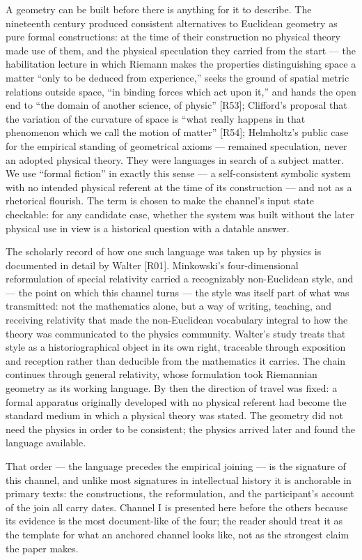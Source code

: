 \documentclass[11pt,a4paper]{article}
\begin{document}
A geometry can be built before there is anything for it to describe. The nineteenth century produced consistent alternatives to Euclidean geometry as pure formal constructions: at the time of their construction no physical theory made use of them, and the physical speculation they carried from the start — the habilitation lecture in which Riemann makes the properties distinguishing space a matter ``only to be deduced from experience,'' seeks the ground of spatial metric relations outside space, ``in binding forces which act upon it,'' and hands the open end to ``the domain of another science, of physic'' [R53]; Clifford's proposal that the variation of the curvature of space is ``what really happens in that phenomenon which we call the motion of matter'' [R54]; Helmholtz's public case for the empirical standing of geometrical axioms — remained speculation, never an adopted physical theory. They were languages in search of a subject matter. We use ``formal fiction'' in exactly this sense — a self-consistent symbolic system with no intended physical referent at the time of its construction — and not as a rhetorical flourish. The term is chosen to make the channel's input state checkable: for any candidate case, whether the system was built without the later physical use in view is a historical question with a datable answer.

The scholarly record of how one such language was taken up by physics is documented in detail by Walter [R01]. Minkowski's four-dimensional reformulation of special relativity carried a recognizably non-Euclidean style, and — the point on which this channel turns — the style was itself part of what was transmitted: not the mathematics alone, but a way of writing, teaching, and receiving relativity that made the non-Euclidean vocabulary integral to how the theory was communicated to the physics community. Walter's study treats that style as a historiographical object in its own right, traceable through exposition and reception rather than deducible from the mathematics it carries. The chain continues through general relativity, whose formulation took Riemannian geometry as its working language. By then the direction of travel was fixed: a formal apparatus originally developed with no physical referent had become the standard medium in which a physical theory was stated. The geometry did not need the physics in order to be consistent; the physics arrived later and found the language available.

That order — the language precedes the empirical joining — is the signature of this channel, and unlike most signatures in intellectual history it is anchorable in primary texts: the constructions, the reformulation, and the participant's account of the join all carry dates. Channel I is presented here before the others because its evidence is the most document-like of the four; the reader should treat it as the template for what an anchored channel looks like, not as the strongest claim the paper makes.
\end{document}
